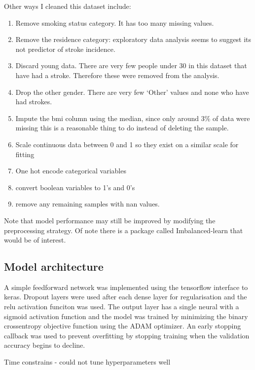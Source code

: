 \documentclass[12pt]{article}
\begin{document}
    Other ways I cleaned this dataset include:
    \begin{enumerate}
        \item Remove smoking status category. It has too many missing values.
        \item Remove the residence category: exploratory data analysis seems to suggest its not predictor of stroke incidence.
        \item Discard young data. There are very few people under 30 in this dataset that have had a stroke. Therefore these were removed from the analysis.
        \item Drop the other gender. There are very few `Other' values and none who have had strokes.
        \item Impute the bmi column using the median, since only around 3\% of data were missing this is a reasonable thing to do instead of deleting the sample.
        \item Scale continuous data between 0 and 1 so they exist on a similar scale for fitting
        \item One hot encode categorical variables
        \item convert boolean variables to 1's and 0's
        \item remove any remaining samples with nan values.
    \end{enumerate}

    Note that model performance may still be improved by modifying the preprocessing strategy. Of note there is a
    package called Imbalanced-learn that would be of interest.

    \subsection{Model architecture}
    A simple feedforward network was implemented using the tensorflow interface to keras. Dropout layers were used
    after each dense layer for regularisation and the relu activation funciton was used. The output layer has a single
    neural with a sigmoid activation function and the model was trained by minimizing the binary crossentropy objective
    function using the ADAM optimizer. An early stopping callback was used to prevent overfitting by stopping training
    when the validation accuracy begins to decline.


    Time constrains
    - could not tune hyperparameters well
\end{document}
